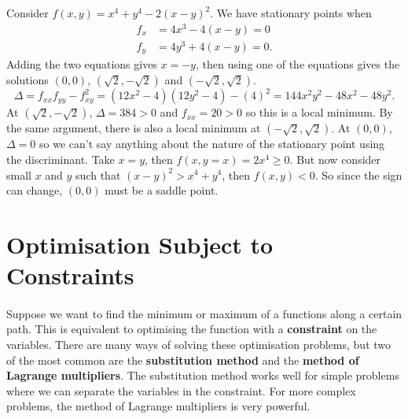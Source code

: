 \documentclass[../multivariate_calculus.tex]{subfiles}
\begin{document}
        \begin{example}
            Consider $f(x,y)=x^4+y^4-2(x-y)^2$. We have stationary points when
            \begin{align}
                f_x&=4x^3-4(x-y)=0\\
                f_y&=4y^3+4(x-y)=0.
            \end{align}
            Adding the two equations gives $x=-y$, then using one of the equations gives the solutions $(0,0)$, $(\sqrt{2},-\sqrt{2})$ and $(-\sqrt{2},\sqrt{2})$.
            \begin{equation}
                \Delta=f_{xx}f_{yy}-f_{xy}^2=(12x^2-4)(12y^2-4)-(4)^2=144x^2y^2-48x^2-48y^2.
            \end{equation}
            At $(\sqrt{2},-\sqrt{2})$, $\Delta=384>0$ and $f_{xx}=20>0$ so this is a local minimum.
            By the same argument, there is also a local minimum at $(-\sqrt{2},\sqrt{2})$.
            At $(0,0)$, $\Delta=0$ so we can't say anything about the nature of the stationary point using the discriminant.
            Take $x=y$, then $f(x,y=x)=2x^4\geq0$.
            But now consider small $x$ and $y$ such that $(x-y)^2>x^4+y^4$, then $f(x,y)<0$.
            So since the sign can change, $(0,0)$ must be a saddle point.
        \end{example}

    \section{Optimisation Subject to Constraints}
        \paragraph{}
        Suppose we want to find the minimum or maximum of a functions along a certain path.
        This is equivalent to optimising the function with a \textbf{constraint} on the variables.
        There are many ways of solving these optimisation problems, but two of the most common are the \textbf{substitution method} and the \textbf{method of Lagrange multipliers}.
        The substitution method works well for simple problems where we can separate the variables in the constraint.
        For more complex problems, the method of Lagrange multipliers is very powerful.
\end{document}
